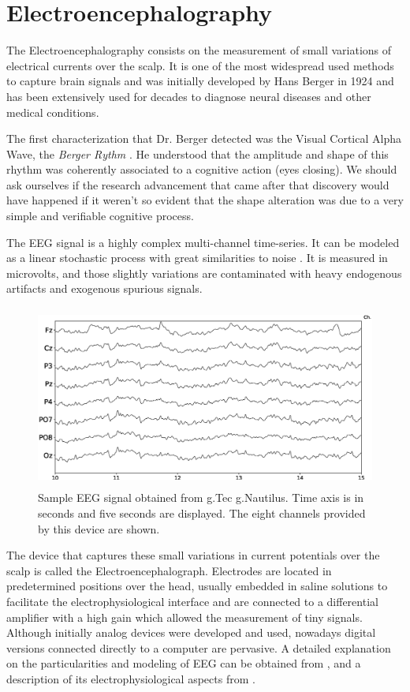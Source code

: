 \documentclass[brainsci,article,submit,moreauthors,pdftex,10pt,a4paper]{mdpi}
\begin{document}
\section{Electroencephalography}
\label{EEG}

The Electroencephalography consists on the measurement of small variations of electrical currents over the scalp.  It is one of the most widespread used methods to capture brain signals and was initially developed by Hans Berger in 1924 and has been extensively used for decades to diagnose neural diseases and other medical conditions.

The first characterization that Dr. Berger detected was the Visual Cortical Alpha Wave, the \textit{Berger Rythm} \citep{Jansen1991}.  He understood that the amplitude and shape of this rhythm was coherently associated to a cognitive action (eyes closing).  
We should ask ourselves if the research advancement that came after that discovery would have happened if it weren't so evident that the shape alteration was due to a very simple and verifiable cognitive process.

The EEG signal is a highly complex multi-channel time-series.  It can be modeled as a linear stochastic process with great similarities to noise \citep{Thakor2004}.  It is measured in microvolts, and those slightly variations are contaminated with heavy endogenous artifacts and exogenous spurious signals.  
 
\begin{figure}[H]
\centering
\includegraphics[height=6cm,width=12cm]{images/sampleeeg.eps}
\caption{Sample EEG signal obtained from g.Tec g.Nautilus.  Time axis is in seconds and five seconds are displayed.  The eight channels provided by this device are shown.}
\label{fig:sampleeeg}
\end{figure}


The device that captures these small variations in current potentials over the scalp is called the Electroencephalograph.  Electrodes are located in predetermined positions over the head, usually embedded in saline solutions to facilitate the electrophysiological interface and are connected to a differential amplifier with a high gain which allowed the measurement of tiny signals. Although initially analog devices were developed and used, nowadays digital versions connected directly to a computer are pervasive.  A detailed explanation on the particularities and modeling of EEG can be obtained from \citep{Jackson2014}, and a description of its electrophysiological aspects from \citep{Haberman2012}.
\end{document}
